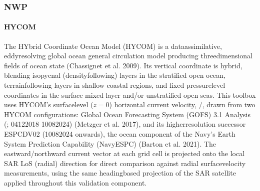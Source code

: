 \documentclass[a4paper,10pt,english]{sphinxmanual}
\begin{document}
\subsubsection{NWP}
\label{\detokenize{05_reference_datasets:nwp-1}}\label{\detokenize{05_reference_datasets:id6}}

\paragraph{HYCOM}
\label{\detokenize{05_reference_datasets:hycom}}
\sphinxAtStartPar
{}

\sphinxAtStartPar
The HYbrid Coordinate Ocean Model (HYCOM) is a data\sphinxhyphen{}assimilative, eddy\sphinxhyphen{}resolving global ocean general circulation model producing three\sphinxhyphen{}dimensional fields of ocean state (Chassignet et al. 2009). Its vertical coordinate is hybrid, blending isopycnal (density\sphinxhyphen{}following) layers in the stratified open ocean, terrain\sphinxhyphen{}following layers in shallow coastal regions, and fixed pressure\sphinxhyphen{}level coordinates in the surface mixed layer and/or unstratified open seas. This toolbox uses HYCOM’s surface\sphinxhyphen{}level (\(z=0\)) horizontal current velocity, /, drawn from two HYCOM configurations: Global Ocean Forecasting System (GOFS) 3.1 Analysis (; 04\sphinxhyphen{}12\sphinxhyphen{}2018 \sphinxhyphen{} 10\sphinxhyphen{}08\sphinxhyphen{}2024) (Metzger et al. 2017), and its higher\sphinxhyphen{}resolution successor ESPC\sphinxhyphen{}D\sphinxhyphen{}V02 (10\sphinxhyphen{}08\sphinxhyphen{}2024 onwards), the ocean component of the Navy’s Earth System Prediction Capability (Navy\sphinxhyphen{}ESPC) (Barton et al. 2021). The eastward/northward current vector at each grid cell is projected onto the local SAR LoS (radial) direction for direct comparison against radial surface\sphinxhyphen{}velocity measurements, using the same heading\sphinxhyphen{}based projection of the SAR satellite applied throughout this validation component.

\sphinxAtStartPar
{}
\end{document}
